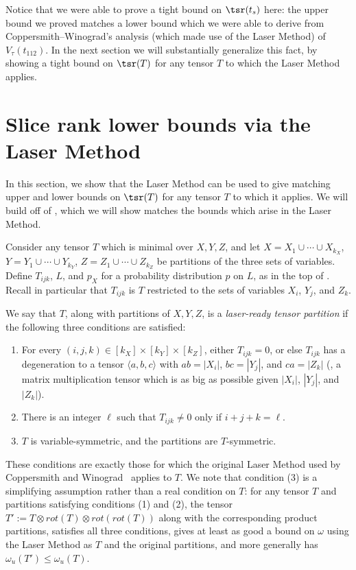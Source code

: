 \documentclass{toc}
\begin{document}
Notice that we were able to prove a tight bound on $\tsr(t_s)$ here: the upper bound we proved matches a lower bound which we were able to derive from Coppersmith--Winograd's analysis (which made use of the Laser Method) of $V_\tau(t_{112})$. In the next section we will substantially generalize this fact, by showing a tight bound on $\tsr(T)$ for any tensor $T$ to which the Laser Method applies.

%
\section{Slice rank lower bounds via the Laser Method} \label{lasersec}

In this section, we show that the Laser Method can be used to give matching upper and lower bounds on $\tsr(T)$ for any tensor $T$ to which it applies. We will build off of , which we will show matches the bounds which arise in the Laser Method.

Consider any tensor $T$ which is minimal over $X,Y,Z$, and let $X = X_1 \cup \cdots \cup X_{k_X}$, $Y = Y_1 \cup \cdots \cup Y_{k_Y}$, $Z = Z_1 \cup \cdots \cup Z_{k_Z}$ be partitions of the three  
%
sets of variables. 
Define $T_{ijk}$, $L$, and $p_X$ for a probability distribution $p$ on $L$, as in the top of . Recall in particular that $T_{ijk}$ is $T$ restricted to the  
%
sets of variables
$X_i$, $Y_j$, and $Z_k$.

\begin{definition} \label{laserable}
We say that $T$, along with partitions of $X,Y,Z$, is a \emph{laser-ready tensor partition} if the following three conditions are satisfied:
\begin{enumerate}[(1)]
    \item For every $(i,j,k) \in [k_X] \times [k_Y] \times [k_Z]$, either $T_{ijk} = 0$, or else $T_{ijk}$ has a degeneration to a tensor $\langle a,b,c \rangle$ with $ab = |X_i|$, $bc = |Y_j|$, and $ca = |Z_k|$ (\ie, a matrix multiplication tensor which is as big as possible given $|X_i|$, $|Y_j|$, and $|Z_k|$).
    \item There is an integer $\ell$ such that $T_{ijk} \neq 0$ only if $i+j+k=\ell$.
    \item $T$ is variable-symmetric, and the partitions are $T$-symmetric.
\end{enumerate}
\end{definition}

These conditions are exactly those for which the original Laser Method used by Coppersmith and Winograd~\cite{coppersmith} applies to $T$. We note that condition (3) is a simplifying assumption rather than a real condition on $T$: for any tensor $T$ and partitions satisfying conditions (1) and (2), the tensor $T' := T \otimes rot(T) \otimes rot(rot(T))$ along with the corresponding product partitions, satisfies all three conditions, gives at least as good a bound on $\omega$ using the Laser Method as $T$ and the original partitions, and more generally has $\omega_u(T') \leq \omega_u(T)$.
\end{document}
